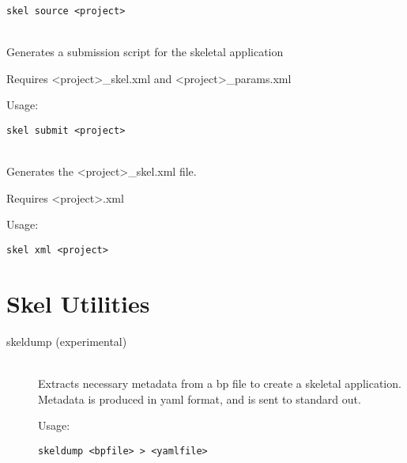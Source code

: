 \begin{description}
{\tt skel source <project>}
  \item[skel submit] \hfill \\
Generates a submission script for the skeletal application

Requires <project>\_skel.xml and <project>\_params.xml

Usage:

{\tt skel submit <project>}

  \item[skel xml] \hfill \\
Generates the <project>\_skel.xml file.

Requires <project>.xml

Usage:

{\tt skel xml <project>}
\end{description}

\section{Skel Utilities}
\begin{description}
  \item[skeldump (experimental)] \hfill \\
Extracts necessary metadata from a bp file to create a skeletal application.
Metadata is produced in yaml format, and is sent to standard out.

Usage:

{\tt skeldump <bpfile> > <yamlfile>}

\end{description}

